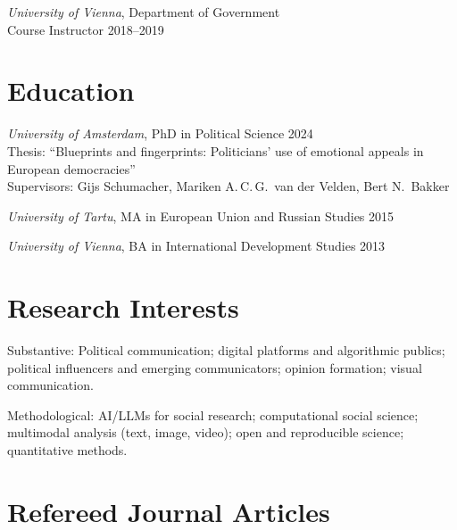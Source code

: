 \documentclass[11pt,a4paper]{article}
\begin{document}
\textit{University of Vienna}, Department of Government\\
\hspace*{1em}Course Instructor \hfill 2018--2019


\section{Education}

\textit{University of Amsterdam}, PhD in Political Science \hfill 2024\\
\hspace*{1em}Thesis: ``Blueprints and fingerprints: Politicians' use of emotional appeals in European democracies''\\
\hspace*{1em}Supervisors: Gijs Schumacher, Mariken A.\,C.\,G.\ van der Velden, Bert N.\ Bakker

\textit{University of Tartu}, MA in European Union and Russian Studies  \hfill 2015

\textit{University of Vienna}, BA in International Development Studies \hfill 2013


\section{Research Interests}

Substantive: Political communication; digital platforms and algorithmic publics; political influencers and emerging communicators; opinion formation; visual communication.

Methodological: AI/LLMs for social research; computational social science; multimodal analysis (text, image, video); open and reproducible science; quantitative methods.


\section{Refereed Journal Articles}
\end{document}

